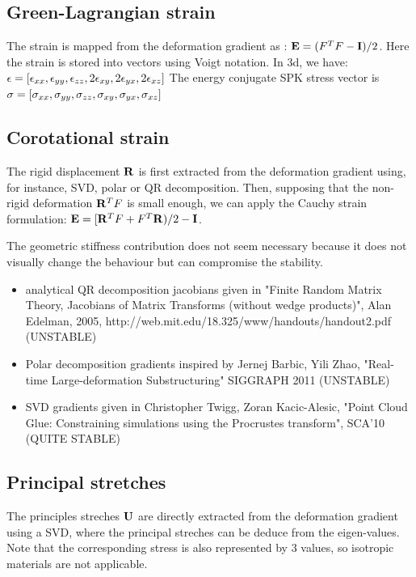 \subsection{Green-Lagrangian strain}

The strain is mapped from the deformation gradient as : $\mathbf{{E}} = (F^TF - \mathbf{{I}} )/2$.
Here the strain is stored into vectors using Voigt notation. In 3d, we have: $\epsilon = [\epsilon_{xx} , \epsilon_{yy} , \epsilon_{zz} , 2\epsilon_{xy} , 2\epsilon_{yx} , 2\epsilon_{xz} ] $
The energy conjugate SPK stress vector is $\sigma = [\sigma_{xx} , \sigma_{yy} , \sigma_{zz} , \sigma_{xy} , \sigma_{yx} , \sigma_{xz} ] $

\subsection{Corotational strain}

The rigid displacement $\mathbf{{R}}$ is first extracted from the deformation gradient using, for instance, SVD, polar or QR decomposition.
Then, supposing that the non-rigid deformation $\mathbf{{R}}^T F$ is small enough, we can apply the Cauchy strain formulation:  $\mathbf{{E}} = [\mathbf{{R}}^T F + F^T \mathbf{{R}} ) /2 - \mathbf{{I}} $.


The geometric stiffness contribution does not seem necessary because it does not visually change the behaviour but can compromise the stability.
\begin{itemize}
\item analytical QR decomposition jacobians given in "Finite Random Matrix Theory, Jacobians of Matrix Transforms (without wedge products)", Alan Edelman, 2005, http://web.mit.edu/18.325/www/handouts/handout2.pdf (UNSTABLE)
\item Polar decomposition gradients inspired by Jernej Barbic, Yili Zhao, "Real-time Large-deformation Substructuring" SIGGRAPH 2011 (UNSTABLE)
\item SVD gradients given in Christopher Twigg, Zoran Kacic-Alesic, "Point Cloud Glue: Constraining simulations using the Procrustes transform", SCA'10 (QUITE STABLE)
\end{itemize}

\subsection{Principal stretches}

The principles streches $\mathbf{{U}}$ are directly extracted from the deformation gradient using a SVD, where the principal streches can be deduce from the eigen-values.
Note that the corresponding stress is also represented by 3 values, so isotropic materials are not applicable.

